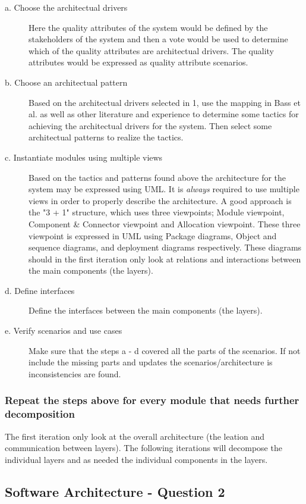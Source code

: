 \begin{description}
    \item[a. Choose the architectual drivers]
  Here the quality attributes of the system would be defined by the stakeholders of the system and then a vote would be used to determine which of the quality attributes are architectual drivers. The quality attributes would be expressed as quality attribute scenarios.
    \item[b. Choose an architectual pattern]
  Based on the architectual drivers selected in 1, use the mapping in Bass et al. as well as other literature and experience to determine some tactics for achieving the architectual drivers for the system. Then select some architectual patterns to realize the tactics.
    \item[c. Instantiate modules using multiple views]
  Based on the tactics and patterns found above the architecture for the system may be expressed using UML. It is \emph{always} required to use multiple views in order to properly describe the architecture. A good approach is the "3 + 1" structure, which uses three viewpoints; Module viewpoint, Component \& Connector viewpoint and Allocation viewpoint. These three viewpoint is expressed in UML using Package diagrams, Object and sequence diagrams, and deployment diagrams respectively. These diagrams should in the first iteration only look at relations and interactions between the main components (the layers).
    \item[d. Define interfaces]
  Define the interfaces between the main components (the layers).
    \item[e. Verify scenarios and use cases]
  Make sure that the steps a - d covered all the parts of the scenarios. If not include the missing parts and updates the scenarios/architecture is inconsistencies are found.
\end{description}
\subsubsection{Repeat the steps above for every module that needs further decomposition}
The first iteration only look at the overall architecture (the leation and communication between layers). The following iterations will decompose the individual layers and as needed the individual components in the layers.

\subsection{Software Architecture - Question 2}

